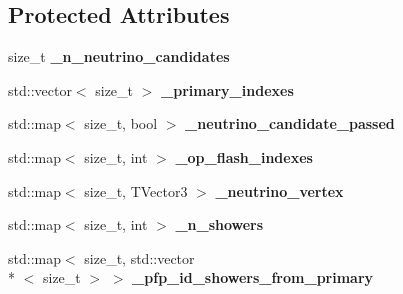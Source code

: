 \subsection*{Protected Attributes}
\begin{DoxyCompactItemize}
\item 
\hypertarget{classlee_1_1ElectronEventSelectionAlg_ab595a7373a091aab62b8f199248f320d}{size\-\_\-t {\bfseries \-\_\-n\-\_\-neutrino\-\_\-candidates}}\label{classlee_1_1ElectronEventSelectionAlg_ab595a7373a091aab62b8f199248f320d}

\item 
\hypertarget{classlee_1_1ElectronEventSelectionAlg_a90143a319f9dd71c5ba32b658f30ceb7}{std\-::vector$<$ size\-\_\-t $>$ {\bfseries \-\_\-primary\-\_\-indexes}}\label{classlee_1_1ElectronEventSelectionAlg_a90143a319f9dd71c5ba32b658f30ceb7}

\item 
\hypertarget{classlee_1_1ElectronEventSelectionAlg_ad074e6a2ccd754a2c15efa834932ffb9}{std\-::map$<$ size\-\_\-t, bool $>$ {\bfseries \-\_\-neutrino\-\_\-candidate\-\_\-passed}}\label{classlee_1_1ElectronEventSelectionAlg_ad074e6a2ccd754a2c15efa834932ffb9}

\item 
\hypertarget{classlee_1_1ElectronEventSelectionAlg_a2eb55a71628710eb97f89b2e6d78d236}{std\-::map$<$ size\-\_\-t, int $>$ {\bfseries \-\_\-op\-\_\-flash\-\_\-indexes}}\label{classlee_1_1ElectronEventSelectionAlg_a2eb55a71628710eb97f89b2e6d78d236}

\item 
\hypertarget{classlee_1_1ElectronEventSelectionAlg_a25adf65208b5fcbb82b5f2bf69bc132c}{std\-::map$<$ size\-\_\-t, T\-Vector3 $>$ {\bfseries \-\_\-neutrino\-\_\-vertex}}\label{classlee_1_1ElectronEventSelectionAlg_a25adf65208b5fcbb82b5f2bf69bc132c}

\item 
\hypertarget{classlee_1_1ElectronEventSelectionAlg_a76fb1477a75421ece942e311f9cac1d7}{std\-::map$<$ size\-\_\-t, int $>$ {\bfseries \-\_\-n\-\_\-showers}}\label{classlee_1_1ElectronEventSelectionAlg_a76fb1477a75421ece942e311f9cac1d7}

\item 
\hypertarget{classlee_1_1ElectronEventSelectionAlg_a6d6863ea6968da00aedb35cdcc11e857}{std\-::map$<$ size\-\_\-t, std\-::vector\\*
$<$ size\-\_\-t $>$ $>$ {\bfseries \-\_\-pfp\-\_\-id\-\_\-showers\-\_\-from\-\_\-primary}}\label{classlee_1_1ElectronEventSelectionAlg_a6d6863ea6968da00aedb35cdcc11e857}


\end{DoxyCompactItemize}
